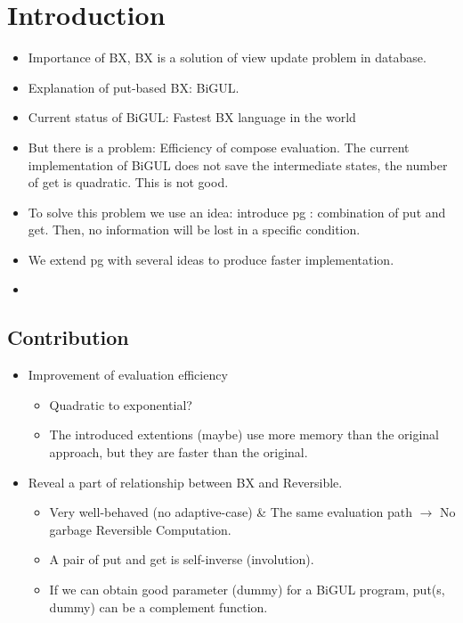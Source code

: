 \documentclass[runningheads]{llncs}
\begin{document}
\section{Introduction}



\begin{itemize}
\item Importance of BX, BX is a solution of view update problem in database.
\item Explanation of put-based BX: BiGUL.
\item Current status of BiGUL: Fastest BX language in the world
\item But there is a problem: Efficiency of compose evaluation. The current implementation of BiGUL does not save the intermediate states, the number of get is quadratic. This is not good.
\item To solve this problem we use an idea: introduce pg : combination of put and get. Then, no information will be lost in a specific condition.
\item We extend pg with several ideas to produce faster implementation.
\item 
\end{itemize}

\subsection{Contribution}

\begin{itemize}
\item Improvement of evaluation efficiency
  \begin{itemize}
  \item Quadratic to exponential? 
  \item The introduced extentions (maybe) use more memory than the original approach, but they are faster than the original.
  \end{itemize}
\item Reveal a part of relationship between BX and Reversible.
  \begin{itemize}
  \item Very well-behaved (no adaptive-case) \& The same evaluation path $\to$ No garbage Reversible Computation.
  \item A pair of put and get is self-inverse (involution).
  \item If we can obtain good parameter (dummy) for a BiGUL program,
    put(s, dummy) can be a complement function.
  \end{itemize}

\end{itemize}
\end{document}
